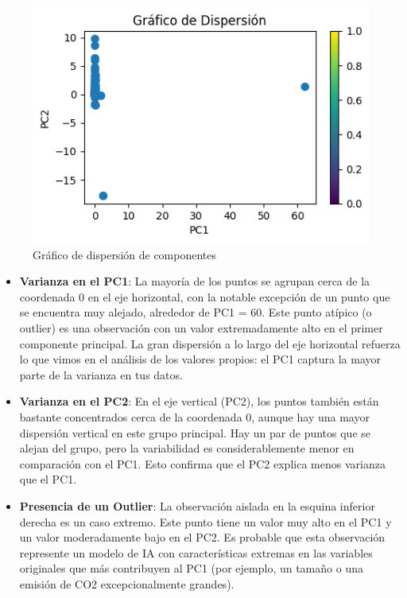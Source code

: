 \documentclass[journal]{IEEEtran}
\begin{document}
	\begin{figure}[H]
		\centering
		\includegraphics[width=0.8\columnwidth]{assets/dispersion.png}
		\caption{Gráfico de dispersión de componentes}
		\label{fig:pca_scatter}
	\end{figure}
	\begin{itemize}
		\item \textbf{Varianza en el PC1}: La mayoría de los puntos se agrupan cerca de la coordenada 0 en el eje horizontal, con la notable excepción de un punto que se encuentra muy alejado, alrededor de PC1 = 60. Este punto atípico (o outlier) es una observación con un valor extremadamente alto en el primer componente principal. La gran dispersión a lo largo del eje horizontal refuerza lo que vimos en el análisis de los valores propios: el PC1 captura la mayor parte de la varianza en tus datos.
		\item \textbf{Varianza en el PC2}: En el eje vertical (PC2), los puntos también están bastante concentrados cerca de la coordenada 0, aunque hay una mayor dispersión vertical en este grupo principal. Hay un par de puntos que se alejan del grupo, pero la variabilidad es considerablemente menor en comparación con el PC1. Esto confirma que el PC2 explica menos varianza que el PC1.
		\item \textbf{Presencia de un Outlier}:  La observación aislada en la esquina inferior derecha es un caso extremo. Este punto tiene un valor muy alto en el PC1 y un valor moderadamente bajo en el PC2. Es probable que esta observación represente un modelo de IA con características extremas en las variables originales que más contribuyen al PC1 (por ejemplo, un tamaño o una emisión de CO2 excepcionalmente grandes).
	\end{itemize}
	
\end{document}
